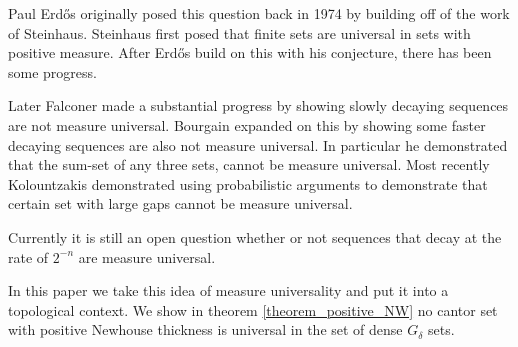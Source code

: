 Paul Erd\H{o}s originally posed this question back in 1974 by building off of the work of Steinhaus.  Steinhaus\cite{Steinhaus} first posed that finite sets are universal in sets with positive measure.  After Erd\H{o}s build on this with his conjecture, there has been some progress.

Later Falconer \cite{Falconer} made a substantial progress by showing slowly decaying sequences are not measure universal.  Bourgain \cite{Bourgain} expanded on this by showing some faster decaying sequences are also not measure universal.  In particular he demonstrated that the sum-set of any three sets, cannot be measure universal.  Most recently Kolountzakis \cite{Kolo} demonstrated using probabilistic arguments to demonstrate that certain set with large gaps cannot be measure universal.  

Currently it is still an open question whether or not sequences that decay at the rate of $2^{-n}$ are measure universal. 


In this paper we take this idea of measure universality and put it into a topological context.  We show in theorem \ref{theorem_positive_NW} no cantor set with positive Newhouse thickness is universal in the set of dense $G_\delta$ sets.



